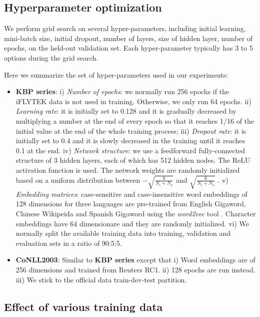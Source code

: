 \documentclass[11pt,a4paper]{article}
\begin{document}
\subsection{Hyperparameter optimization}

We perform grid search on several hyper-parameters, 
including initial learning, mini-batch size, initial dropout, 
number of layers, size of hidden layer, number of epochs, on the held-out validation set.
Each hyper-parameter typically has 3 to 5 options during the grid search. 

Here we summarize the set of hyper-parameters used in our experiments:
\begin{itemize}
	\item \textbf{KBP series}:
	i) {\it Number of epochs}: we normally run 256 epochs if the iFLYTEK data is not used in training. Otherwise, we only run 64 epochs. ii) {\it Learning rate}: it is initially set to 0.128 and it is gradually decreased by multiplying a number at the end of every epoch so that  it reaches 1/16 of the initial value at the end of the whole training process; iii) {\it Dropout rate}: it is initially set to 0.4 and it is slowly decreased in the training until it reaches 0.1 at the end. iv) {\it Network structure}: we use a feedforward fully-connected structure of 3 hidden layers, each of which has 512 hidden nodes. The ReLU activation function is used. The network weights are randomly initialized based on a uniform distribution between $-\sqrt{\frac{6}{N_i + N_o}}$  and $\sqrt{\frac{6}{N_i + N_o}}$ \cite{glorot2011deep}. v) {\it Embedding matrices}: 
	case-sensitive and case-insensitive word embeddings of 128 dimensions for three languages are pre-trained from English Gigaword, Chinese Wikipeida and Spanish Gigaword using the {\em word2vec} tool \cite{mikolov2013distributed}. Character embeddings have 64 dimensionare and they are randomly initialized. vi) We normally split the available training data into training, validation and evaluation sets in a ratio of 90:5:5.
	\item \textbf{CoNLL2003}:
	Similar to \textbf{KBP series} except that i) Word embeddings are of 256 dimensions and trained from Reuters RC1. ii) 128 epochs are run instead.
	iii) We stick to the official data train-dev-test partition.  
\end{itemize}


\subsection{Effect of various training data}
\end{document}
